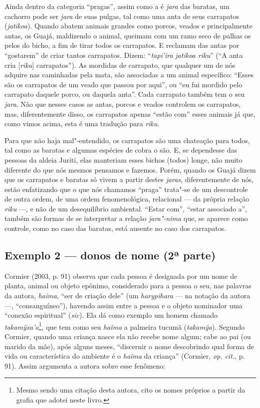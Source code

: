 Ainda dentro da categoria ``pragas'', assim como a  é \emph{jara}
das baratas, um cachorro pode ser \emph{jara} de suas pulgas, tal como
uma anta de seus carrapatos (\emph{jatikoa}). Quando abatem animais
grandes como porcos, veados e principalmente antas, os Guajá, maldizendo
o animal, queimam com um ramo seco de palhas os pelos do bicho, a fim de
tirar todos os carrapatos. E reclamam das antas por ``gostarem'' de criar
tantos carrapatos. Dizem: ``\emph{tapi'ira} \emph{jatikoa riku}'' (``A
anta cria {[}\emph{riku}{]} carrapatos''). As mordidas de carrapato, que
qualquer um de nós adquire nas caminhadas pela mata, são associadas a um
animal específico: ``Esses são os carrapatos de um veado que passou por
aqui'', ou ``eu fui mordido pelo carrapato daquele porco, ou daquela
anta''. Cada carrapato também tem o seu \emph{jara}. Não que nesses
casos as antas, porcos e veados controlem os carrapatos, mas,
diferentemente disso, os carrapatos apenas ``estão com'' esses animais já
que, como vimos acima, esta é uma tradução para \emph{riku}.

Para que não haja mal"-entendido, os carrapatos são uma chateação para
todos, tal como as baratas e algumas espécies de cobra o são. E, se
dependesse das pessoas da aldeia Juriti, elas manteriam esses bichos
(todos) longe, não muito diferente do que nós mesmos pensamos e fazemos.
Porém, quando os Guajá dizem que os carrapatos e baratas só vivem a
partir destes \emph{jaras}, diferentemente de nós, estão enfatizando que
o que nós chamamos ``praga'' trata"-se de um descontrole de outra ordem,
de uma ordem fenomenológica, relacional --- da própria relação \emph{riku}
---, e não de um desequilíbrio ambiental. ``Estar com'', ``estar associado
a'', também são formas de se interpretar a relação \emph{jara"-nima} que,
se aparece como controle, como no caso das baratas, está ausente no caso
dos carrapatos.

\subsection{Exemplo 2 --- donos de nome (2ª parte)}

\forceindent
Cormier (2003, p. 91) observa que cada pessoa é designada por um nome de
planta, animal ou objeto epônimo, considerado para a pessoa o seu, nas
palavras da autora, \emph{haĩma}, ``ser de criação dele'' (um
\emph{harypihara} --- na notação da autora ---, ``consanguíneo''), havendo
assim entre a pessoa e o objeto nominador uma ``conexão espiritual''
(\emph{sic}). Ela dá como exemplo um homem chamado
\emph{takamỹxa'a}\footnote{Mesmo sendo uma citação desta autora, cito os
  nomes próprios a partir da grafia que adotei neste livro.}, que tem
como seu \emph{haĩma} a palmeira tucumã (\emph{takamỹa}). Segundo
Cormier, quando uma criança nasce ela não recebe nome algum; cabe ao pai
(ou marido da mãe), após alguns meses, ``discernir o nome descobrindo
qual forma de vida ou característica do ambiente é o \emph{haĩma} da
criança'' (Cormier, \emph{op. cit.}, p. 91). Assim argumenta a autora sobre esse
fenômeno:

